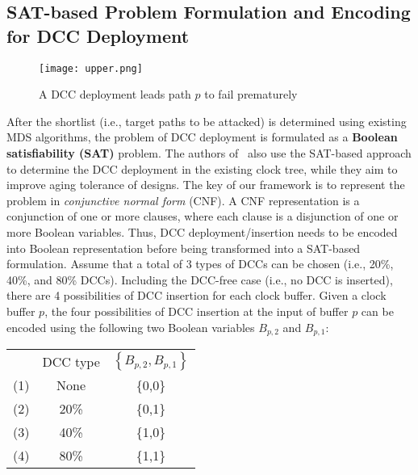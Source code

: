 \subsection{SAT-based Problem Formulation and Encoding for DCC Deployment}
\label{sec:frame:sat}
\begin{comment}
	\begin{figure*}[!ht]
    	\centering
    	\subfigure[A DCC deployment leads path $p$ to fail prematurely]{
    		\label{fig:sub:upper}
        		\texttt{[image: upper.png]}
    	}
   	\hspace{0.1cm}
    	\subfigure[A DCC deployment leads path $p$ to fail post-maturely]{
    		\label{fig:sub:lower}
        		\texttt{[image: lower.png]}
    	}
    	\caption{Illustrative example for the proposed framework based on DCC deployment/insertion}
    	\label{fig:en}
	\end{figure*}
\end{comment}
\begin{figure}
    	\centering
        	\texttt{[image: upper.png]}
       	\caption{A DCC deployment leads path $p$ to fail prematurely}
    	\label{fig:sec:prefail}
\end{figure}
After the shortlist (i.e., target paths to be attacked) is determined using existing MDS algorithms, the problem of DCC deployment is formulated as a \textbf{Boolean satisfiability (SAT)} problem. The authors of~\cite{wu2018maui} also use the SAT-based approach to determine the DCC deployment in the existing clock tree, while they aim to improve aging tolerance of designs. The key of our framework is to represent the problem in \textit{conjunctive normal form} (CNF). A CNF representation is a conjunction of one or more clauses, where each clause is a disjunction of one or more Boolean variables. Thus, DCC deployment/insertion needs to be encoded into Boolean representation before being transformed into a SAT-based formulation. Assume that a total of 3 types of DCCs can be chosen (i.e., 20\%, 40\%, and 80\% DCCs). Including the DCC-free case (i.e., no DCC is inserted), there are 4 possibilities of DCC insertion for each clock buffer. Given a clock buffer $p$, the four possibilities of DCC insertion at the input of buffer $p$ can be encoded using the  following two Boolean variables $B_{p,2}$ and $B_{p,1}$:

{\small
\begin{tabular}{ c c c }
   & DCC type & $\left\{B_{p,2},B_{p,1}\right\}$ \\
  (1)\quad & None & \{0,0\} \\
  (2)\quad & 20\% &  \{0,1\} \\
  (3)\quad & 40\% &  \{1,0\} \\
  (4)\quad & 80\% &  \{1,1\} \\
\end{tabular}}

